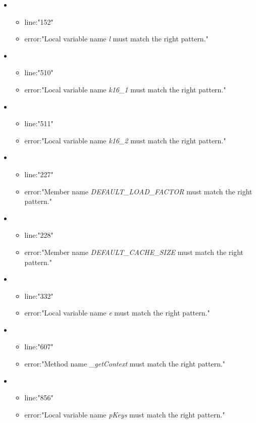 \begin{itemize}
	\item 
	\begin{itemize} 
		\item line:"152" 
		\item error:"Local variable name \emph{l} must match the right pattern." 
	\end{itemize}
	\item 
	\begin{itemize} 
		\item line:"510" 
		\item error:"Local variable name \emph{k16\_1} must match the right pattern." 
	\end{itemize}
	\item 
	\begin{itemize} 
		\item line:"511" 
		\item error:"Local variable name \emph{k16\_2} must match the right pattern." 
	\end{itemize}
	\item 
	\begin{itemize} 
		\item line:"227" 
		\item error:"Member name \emph{DEFAULT\_LOAD\_FACTOR} must match the right pattern." 
	\end{itemize}
	\item 
	\begin{itemize} 
		\item line:"228" 
		\item error:"Member name \emph{DEFAULT\_CACHE\_SIZE} must match the right pattern." 
	\end{itemize}
	\item 
	\begin{itemize} 
		\item line:"332" 
		\item error:"Local variable name \emph{e} must match the right pattern." 
	\end{itemize}
	\item 
	\begin{itemize} 
		\item line:"607" 
		\item error:"Method name \emph{\_getContext} must match the right pattern." 
	\end{itemize}
	\item 
	\begin{itemize} 
		\item line:"856" 
		\item error:"Local variable name \emph{pKeys} must match the right pattern." 

\end{itemize}
\end{itemize}
